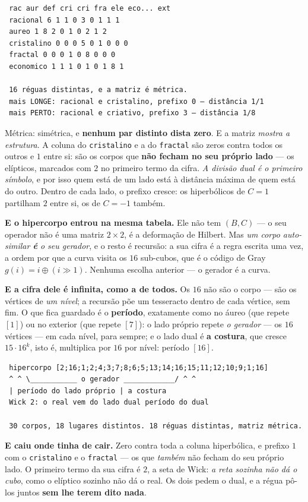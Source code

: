 \documentclass[11pt]{article}
\newcommand{\code}[1]{\texttt{\small #1}}
\theoremstyle{plain}
\theoremstyle{remark}
\begin{document}
\begin{itemize}
\begin{verbatim}
 rac aur def cri cri fra ele eco... ext
 racional 6 1 1 0 3 0 1 1 1
 aureo 1 8 2 0 1 0 2 1 2
 cristalino 0 0 0 5 0 1 0 0 0
 fractal 0 0 0 1 0 8 0 0 0
 economico 1 1 1 0 1 0 1 8 1

 16 réguas distintas, e a matriz é métrica.
 mais LONGE: racional e cristalino, prefixo 0 — distância 1/1
 mais PERTO: racional e criativo, prefixo 3 — distância 1/8
\end{verbatim}

Métrica: simétrica, e \textbf{nenhum par distinto dista zero}. E a matriz \emph{mostra a
estrutura}. A coluna do \code{cristalino} e a do \code{fractal} são zeros contra todos os outros e
$1$ entre si: são os corpos que \textbf{não fecham no seu próprio lado} --- os elípticos, marcados
com $2$ no primeiro termo da cifra. \emph{A divisão dual é o primeiro símbolo}, e por isso quem
está de um lado está à distância máxima de quem está do outro. Dentro de cada lado, o prefixo
cresce: os hiperbólicos de $C=1$ partilham $2$ entre si, os de $C=-1$ também.

\textbf{E o hipercorpo entrou na mesma tabela.} Ele não tem $(B,C)$ --- o seu operador não é uma
matriz $2\times2$, é a deformação de Hilbert. Mas \emph{um corpo auto-similar \textbf{é} o seu
gerador}, e o resto é recursão: a sua cifra é a regra escrita uma vez, a ordem por que a curva
visita os $16$ sub-cubos, que é o código de Gray $g(i)=i\oplus(i\gg1)$. Nenhuma escolha anterior ---
o gerador é a curva.

\textbf{E a cifra dele é infinita, como a de todos.} Os $16$ não são o corpo --- são os vértices
de \emph{um nível}; a recursão põe um tesseracto dentro de cada vértice, sem fim. O que fica
guardado é o \textbf{período}, exatamente como no áureo (que repete $[1]$) ou no exterior (que
repete $[7]$): o lado próprio repete \emph{o gerador} --- os $16$ vértices --- em cada nível, para
sempre; e o lado dual é \textbf{a costura}, que cresce $15\cdot16^k$, isto é, multiplica por $16$
por nível: período $[16]$.

\begin{verbatim}
 hipercorpo [2;16;1;2;4;3;7;8;6;5;13;14;16;15;11;12;10;9;1;16]
 ^ ^ \___________ o gerador ____________/ ^ ^
 | período do lado próprio | a costura
 Wick 2: o real vem do lado dual período do dual

 30 corpos, 18 lugares distintos. 18 réguas distintas, matriz métrica.
\end{verbatim}

\textbf{E caiu onde tinha de cair.} Zero contra toda a coluna hiperbólica, e prefixo $1$ com o
\code{cristalino} e o \code{fractal} --- os que \emph{também} não fecham do seu próprio lado. O
primeiro termo da sua cifra é $2$, a seta de Wick: \emph{a reta sozinha não dá o cubo}, como o
elíptico sozinho não dá o real. Os dois pedem o dual, e a régua pô-los juntos \textbf{sem lhe
terem dito nada}.


\end{itemize}
\end{document}
